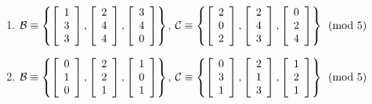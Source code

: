 \begin{enumerate}[!HW!]
\item $\B\equiv\left\{\vr{1\\3\\3}, \vr{2\\4\\4}, \vr{3\\4\\0}\right\}$, $\mathcal{C}\equiv\left\{\vr{2\\0\\2}, \vr{2\\4\\3}, \vr{0\\2\\4}\right\} \pmod 5$ %
\item\label{exer:coordmatrixrealstop} $\B\equiv\left\{\vr{0\\1\\0}, \vr{2\\2\\1}, \vr{1\\0\\1}\right\}$, $\mathcal{C}\equiv\left\{\vr{0\\3\\1}, \vr{2\\1\\3}, \vr{1\\2\\1}\right\} \pmod 5$ %
\end{enumerate}

